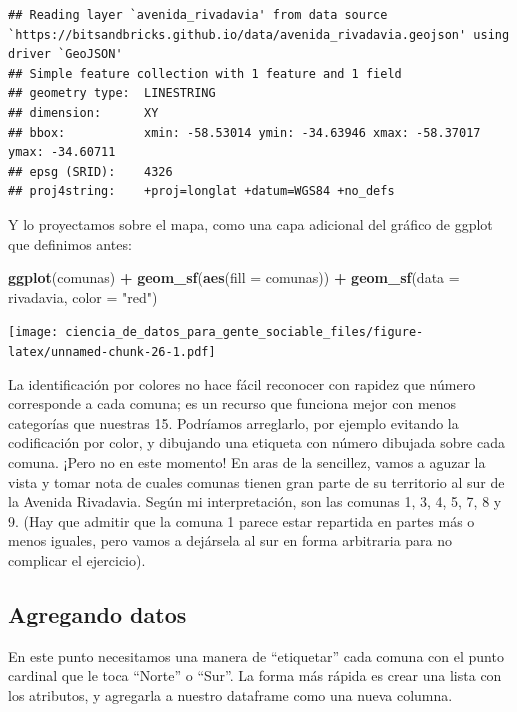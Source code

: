 \documentclass[]{book}
\newenvironment{Shaded}{\begin{snugshade}}{\end{snugshade}}
\newcommand{\KeywordTok}[1]{\textcolor[rgb]{0.13,0.29,0.53}{\textbf{#1}}}
\newcommand{\DataTypeTok}[1]{\textcolor[rgb]{0.13,0.29,0.53}{#1}}
\newcommand{\StringTok}[1]{\textcolor[rgb]{0.31,0.60,0.02}{#1}}
\newcommand{\OperatorTok}[1]{\textcolor[rgb]{0.81,0.36,0.00}{\textbf{#1}}}
\newcommand{\NormalTok}[1]{#1}
\begin{document}
\begin{verbatim}
## Reading layer `avenida_rivadavia' from data source `https://bitsandbricks.github.io/data/avenida_rivadavia.geojson' using driver `GeoJSON'
## Simple feature collection with 1 feature and 1 field
## geometry type:  LINESTRING
## dimension:      XY
## bbox:           xmin: -58.53014 ymin: -34.63946 xmax: -58.37017 ymax: -34.60711
## epsg (SRID):    4326
## proj4string:    +proj=longlat +datum=WGS84 +no_defs
\end{verbatim}

Y lo proyectamos sobre el mapa, como una capa adicional del gráfico de
ggplot que definimos antes:

\begin{Shaded}
\begin{Highlighting}[]
\KeywordTok{ggplot}\NormalTok{(comunas) }\OperatorTok{+}
\StringTok{    }\KeywordTok{geom_sf}\NormalTok{(}\KeywordTok{aes}\NormalTok{(}\DataTypeTok{fill =}\NormalTok{ comunas)) }\OperatorTok{+}
\StringTok{    }\KeywordTok{geom_sf}\NormalTok{(}\DataTypeTok{data =}\NormalTok{ rivadavia, }\DataTypeTok{color =} \StringTok{"red"}\NormalTok{)}
\end{Highlighting}
\end{Shaded}

\texttt{[image: ciencia\_de\_datos\_para\_gente\_sociable\_files/figure-latex/unnamed-chunk-26-1.pdf]}

La identificación por colores no hace fácil reconocer con rapidez que
número corresponde a cada comuna; es un recurso que funciona mejor con
menos categorías que nuestras 15. Podríamos arreglarlo, por ejemplo
evitando la codificación por color, y dibujando una etiqueta con número
dibujada sobre cada comuna. ¡Pero no en este momento! En aras de la
sencillez, vamos a aguzar la vista y tomar nota de cuales comunas tienen
gran parte de su territorio al sur de la Avenida Rivadavia. Según mi
interpretación, son las comunas 1, 3, 4, 5, 7, 8 y 9. (Hay que admitir
que la comuna 1 parece estar repartida en partes más o menos iguales,
pero vamos a dejársela al sur en forma arbitraria para no complicar el
ejercicio).

\subsection{Agregando datos}\label{agregando-datos}

En este punto necesitamos una manera de ``etiquetar'' cada comuna con el
punto cardinal que le toca ``Norte'' o ``Sur''. La forma más rápida es
crear una lista con los atributos, y agregarla a nuestro dataframe como
una nueva columna.
\end{document}
